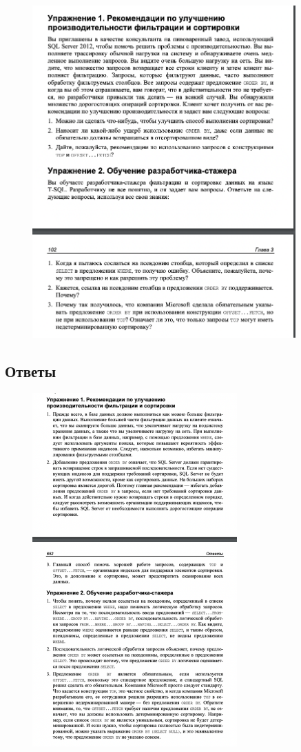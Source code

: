 \begin{figure}[h!]
	\begin{center}
		\includegraphics[width=0.9\textwidth]{img/ex6.png}
	\end{center}
	\captionsetup{justification=centering}
\end{figure}
\clearpage
\subsection*{Ответы}

\begin{figure}[h!]
	\begin{center}
		\includegraphics[width=0.7\textwidth]{img/eans3.png}
	\end{center}
	\captionsetup{justification=centering}
\end{figure}
